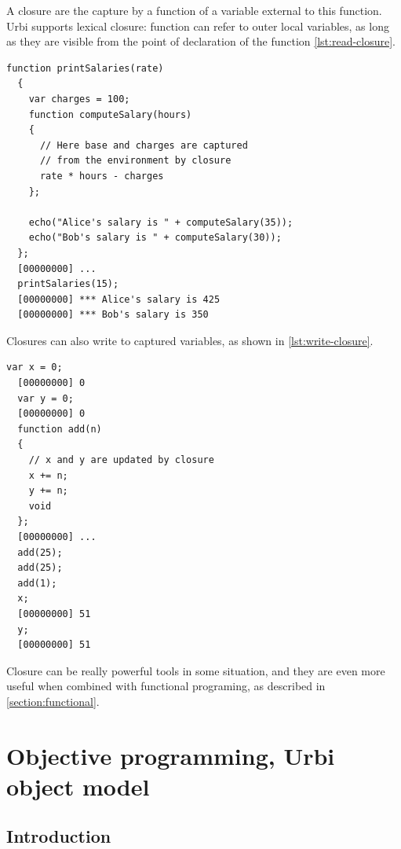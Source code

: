 \documentclass[openright,twoside,12pt]{report}
\newcommand{\urbi}{Urbi\xspace}
\newcommand{\lst}[1]{\autoref{lst:#1}}
\begin{document}
A closure are the capture by a function of a variable external to this
function. \urbi supports lexical closure: function can refer to outer
local variables, as long as they are visible from the point of
declaration of the function \lst{read-closure}.

\begin{lstlisting}[caption=Capturing variables with lexical closures,
  label=lst:read-closure]
  function printSalaries(rate)
  {
    var charges = 100;
    function computeSalary(hours)
    {
      // Here base and charges are captured
      // from the environment by closure
      rate * hours - charges
    };

    echo("Alice's salary is " + computeSalary(35));
    echo("Bob's salary is " + computeSalary(30));
  };
  [00000000] ...
  printSalaries(15);
  [00000000] *** Alice's salary is 425
  [00000000] *** Bob's salary is 350
\end{lstlisting}

Closures can also write to captured variables, as shown in
\lst{write-closure}.

\begin{lstlisting}[caption=Updating captured variables,
  label=lst:write-closure]
  var x = 0;
  [00000000] 0
  var y = 0;
  [00000000] 0
  function add(n)
  {
    // x and y are updated by closure
    x += n;
    y += n;
    void
  };
  [00000000] ...
  add(25);
  add(25);
  add(1);
  x;
  [00000000] 51
  y;
  [00000000] 51
\end{lstlisting}

Closure can be really powerful tools in some situation, and they are
even more useful when combined with functional programing, as
described in \autoref{section:functional}.


\chapter{Objective programming, \urbi object model}
\label{section:objective}


\section{Introduction}
\end{document}
